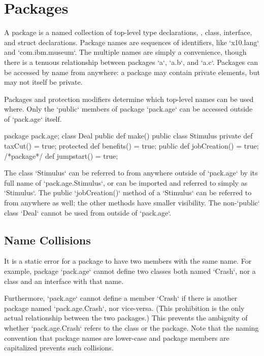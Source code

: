 \section{Packages}

A package is a named collection of top-level type declarations, \viz, class,
interface, and struct declarations. Package names are sequences of
identifiers, like \xcd`x10.lang` and \xcd`com.ibm.museum`. The multiple names
are simply a convenience, though there is a tenuous relationship between
packages \xcd`a`, \xcd`a.b`, and \xcd`a.c`.   Packages can be accessed by
name from anywhere: a package may contain private elements, but may not itself
be private. 

Packages and protection modifiers determine which top-level names can be used
where. Only the \xcd`public` members of package \xcd`pack.age` can be accessed
outside of \xcd`pack.age` itself.  
\begin{xten}
package pack.age;
class Deal {
  public def make() {}
}
public class Stimulus {
  private def taxCut() = true;
  protected def benefits() = true;
  public def jobCreation() = true;
  /*package*/ def jumpstart() = true;
}
\end{xten}
% 
%

The class \xcd`Stimulus` can be referred to from anywhere outside of
\xcd`pack.age` by its full name of \xcd`pack.age.Stimulus`, or can be imported
and referred to simply as \xcd`Stimulus`.  The public \xcd`jobCreation()`
method of a \xcd`Stimulus` can be referred to from anywhere as well; the other
methods have smaller visibility.  The non-\xcd`public` class \xcd`Deal` cannot
be used from outside of \xcd`pack.age`.  



\subsection{Name Collisions}

It is a static error for a package to have two members with the same name. For
example, package \xcd`pack.age` cannot define two classes both named
\xcd`Crash`, nor a class and an interface with that name.

Furthermore, \xcd`pack.age` cannot define a member \xcd`Crash` if there is
another package named \xcd`pack.age.Crash`, nor vice-versa. (This prohibition
is the only actual relationship between the two packages.)  This prevents the
ambiguity of whether \xcd`pack.age.Crash` refers to the class or the package.  
Note that the naming convention that package names are lower-case and package
members are capitalized prevents such collisions.


